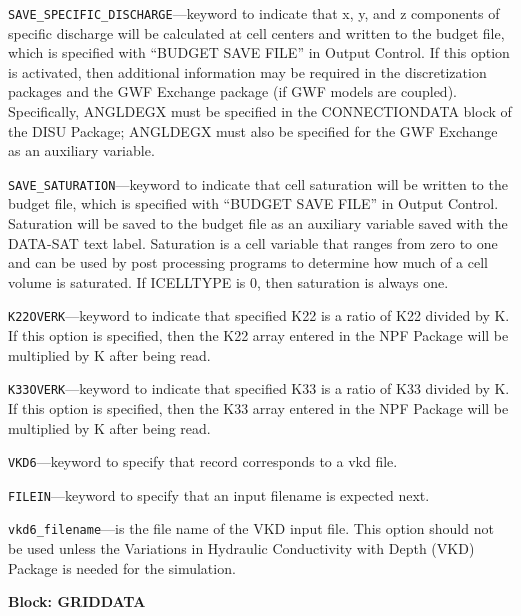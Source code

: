 \begin{description}
\item \texttt{SAVE\_SPECIFIC\_DISCHARGE}---keyword to indicate that x, y, and z components of specific discharge will be calculated at cell centers and written to the budget file, which is specified with ``BUDGET SAVE FILE'' in Output Control.  If this option is activated, then additional information may be required in the discretization packages and the GWF Exchange package (if GWF models are coupled).  Specifically, ANGLDEGX must be specified in the CONNECTIONDATA block of the DISU Package; ANGLDEGX must also be specified for the GWF Exchange as an auxiliary variable.

\item \texttt{SAVE\_SATURATION}---keyword to indicate that cell saturation will be written to the budget file, which is specified with ``BUDGET SAVE FILE'' in Output Control.  Saturation will be saved to the budget file as an auxiliary variable saved with the DATA-SAT text label.  Saturation is a cell variable that ranges from zero to one and can be used by post processing programs to determine how much of a cell volume is saturated.  If ICELLTYPE is 0, then saturation is always one.

\item \texttt{K22OVERK}---keyword to indicate that specified K22 is a ratio of K22 divided by K.  If this option is specified, then the K22 array entered in the NPF Package will be multiplied by K after being read.

\item \texttt{K33OVERK}---keyword to indicate that specified K33 is a ratio of K33 divided by K.  If this option is specified, then the K33 array entered in the NPF Package will be multiplied by K after being read.

\item \texttt{VKD6}---keyword to specify that record corresponds to a vkd file.

\item \texttt{FILEIN}---keyword to specify that an input filename is expected next.

\item \texttt{vkd6\_filename}---is the file name of the VKD input file. This option should not be used unless the Variations in Hydraulic Conductivity with Depth (VKD) Package is needed for the simulation.

\end{description}
\item \textbf{Block: GRIDDATA}

